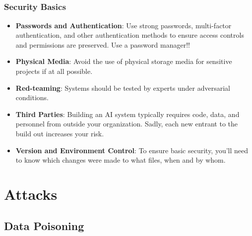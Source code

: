 \documentclass[11pt,
               aspectratio=169,
               hyperref={colorlinks}
               ]{beamer}
\begin{document}
	\subsection*{}
	\begin{frame}
	
	\frametitle{Security Basics}
	
	\begin{itemize}			
			\item \textbf{Passwords and Authentication}: Use strong passwords, multi-factor authentication, and other authentication methods to ensure access controls and permissions are preserved. Use a password manager!!
			\item \textbf{Physical Media}: Avoid the use of physical storage media for sensitive projects if at all possible. 
			\item \textbf{Red-teaming}: Systems should be tested by experts under adversarial conditions.
			\item \textbf{Third Parties}: Building an AI system typically requires code, data, and personnel from outside your organization. Sadly, each new entrant to the build out increases your risk. 
			\item \textbf{Version and Environment Control}: To ensure basic security, you'll need to know which changes were made to what files, when and by whom.
		\end{itemize}
		
	\end{frame}
	\section{Attacks}

		\subsection{Data Poisoning}
\end{document}
